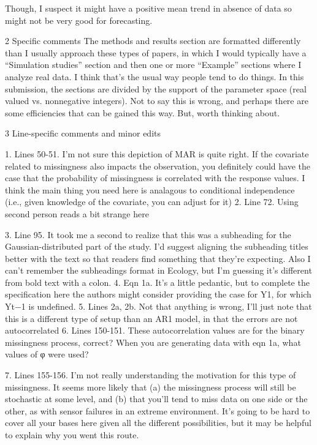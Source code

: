 \documentclass{article}
\begin{document}
Though, I suspect it might have a positive mean trend in absence of data so might not be very good for forecasting.

2 Specific comments
The methods and results section are formatted differently than I usually approach these types of papers, in which I would typically have a “Simulation studies” section and then one or more “Example” sections where I analyze real data. I think that’s the usual way people tend to do things. In this submission, the sections are divided by the support of
the parameter space (real valued vs. nonnegative integers). Not to say this is wrong, and perhaps there are some efficiencies that can be gained this way. But, worth thinking about.

3 Line-specific comments and minor edits

1. Lines 50-51. I’m not sure this depiction of MAR is quite right. If the covariate related to missingness also impacts the observation, you definitely could have the case that the probability of missingness is correlated with the response values. I think the main thing you need here is analagous to conditional independence (i.e., given knowledge of the covariate, you can adjust for it)
2. Line 72. Using second person reads a bit strange here

3. Line 95. It took me a second to realize that this was a subheading for the Gaussian-distributed part of the study. I’d suggest aligning the subheading titles better with the text so that readers find something that they’re expecting. Also I can’t remember the subheadings format in Ecology, but I’m guessing it’s different from bold text with a colon.
4. Eqn 1a. It’s a little pedantic, but to complete the specification here the authors might consider providing the case for Y1, for which Yt−1 is undefined.
5. Lines 2a, 2b. Not that anything is wrong, I’ll just note that this is a different type of setup than an AR1 model, in that the errors are not autocorrelated
6. Lines 150-151. These autocorrelation values are for the binary missingness process, correct? When you are generating data with eqn 1a, what values of φ were used?

7. Lines 155-156. I’m not really understanding the motivation for this type of missingness. It seems more likely that (a) the missingness process will still be stochastic at some level, and (b) that you’ll tend to miss data on one side or the other, as with sensor failures in an extreme environment. It’s going to be hard to cover all your bases here given all the different possibilities, but it may be helpful to explain why you went this route.
\end{document}
